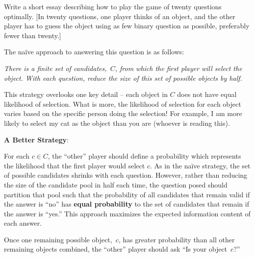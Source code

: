 \newpage
\begin{problem}{5}{24}
  Write a short essay describing how to play the game of twenty questions optimally.  \textnormal{[In twenty questions, one player thinks of an object, and the other player has to guess the object using as few binary question as possible, preferably fewer than twenty.]}
\end{problem}

The na\"ive approach to answering this question is as follows:

\textit{There is a finite set of candidates,~$C$, from which the first player will select the object.  With each question, reduce the size of this set of possible objects by half.}

This strategy overlooks one key detail -- each object in $C$ does not have equal likelihood of selection.  What is more, the likelihood of selection for each object varies based on the specific person doing the selection!  For example, I am more likely to select my cat as the object than you are (whoever is reading this).

\textbf{A Better Strategy}:

For each $c \in C$, the ``other'' player should define a probability which represents the likelihood that the first player would select $c$. As in the na\"ive strategy, the set of possible candidates shrinks with each question.  However, rather than reducing the size of the candidate pool in half each time, the question posed should partition that pool such that the probability of all candidates that remain valid if the answer is ``no'' has \textbf{equal probability} to the set of candidates that remain if the answer is ``yes.''  This approach maximizes the expected information content of each answer.

Once one remaining possible object,~$c$, has greater probability than all other remaining objects combined, the ``other'' player should ask ``Is your object~$c$?''
